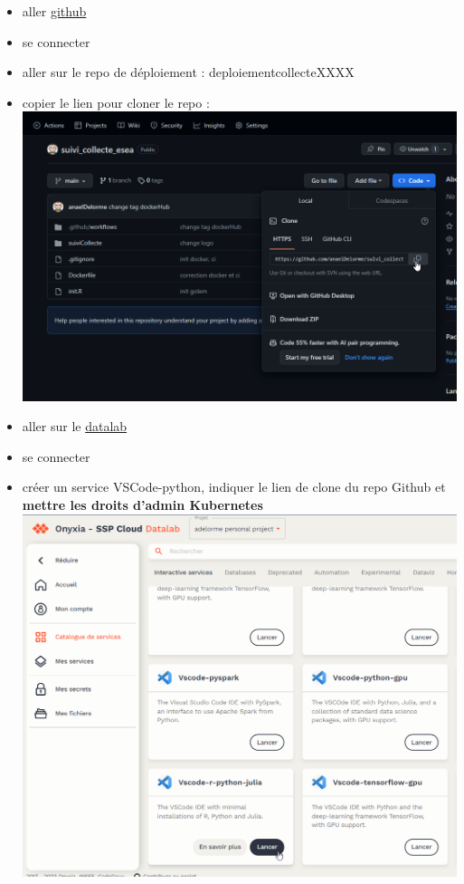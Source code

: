 \documentclass[
  letterpaper,
  DIV=11,
  numbers=noendperiod]{scrreprt}
\providecommand{\tightlist}{%
  \setlength{\itemsep}{0pt}\setlength{\parskip}{0pt}}\usepackage{longtable,booktabs,array}
\begin{document}
\begin{itemize}
\tightlist
\item
  aller \href{https://github.com/}{github}\\
\item
  se connecter\\
\item
  aller sur le repo de déploiement : deploiementcollecteXXXX
\item
  copier le lien pour cloner le repo :\\
  \includegraphics{./images/github_clone.png}\\
\item
  aller sur le \href{https://datalab.sspcloud.fr/}{datalab}\\
\item
  se connecter\\
\item
  créer un service VSCode-python, indiquer le lien de clone du repo
  Github et \textbf{mettre les droits d'admin Kubernetes}
  \includegraphics{./images/datalab_vscode_service.png}\\

\end{itemize}
\end{document}

